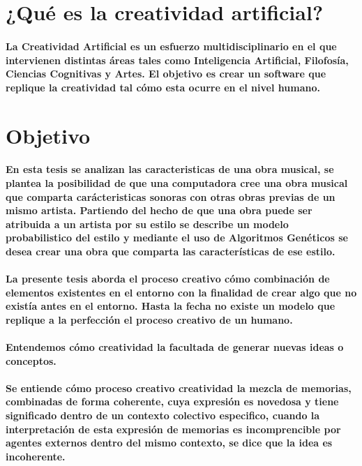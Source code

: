 \section{¿Qué es la creatividad artificial?}
\paragraph{La Creatividad Artificial es un esfuerzo multidisciplinario en el que intervienen distintas áreas tales como Inteligencia Artificial, Filofosía, Ciencias Cognitivas y Artes. El objetivo es crear un software que replique la creatividad tal cómo esta ocurre en el nivel humano.}

\section{Objetivo}
\paragraph{En esta tesis se analizan las caracteristicas de una obra musical, se plantea la posibilidad de que una computadora cree una obra musical que comparta carácteristicas sonoras con otras obras previas de un mismo artista. Partiendo del hecho de que una obra puede ser atribuida a un artista por su estilo se describe un modelo probabilistico del estilo y mediante el uso de Algoritmos Genéticos se desea crear una obra que comparta las características de ese estilo.}

\paragraph{La presente tesis aborda el proceso creativo cómo combinación de elementos existentes en el entorno con la finalidad de crear algo que no existía antes en el entorno. Hasta la fecha no existe un modelo que replique a la perfección el proceso creativo de un humano.}

\paragraph{Entendemos cómo creatividad la facultada de generar nuevas ideas o conceptos.}

\paragraph{Se entiende cómo proceso creativo creatividad la mezcla de memorias, combinadas de forma coherente, cuya expresión es novedosa y tiene significado dentro de un contexto colectivo especifico, cuando la interpretación de esta expresión de memorias es incomprencible por agentes externos dentro del mismo contexto, se dice que la idea es incoherente.}

